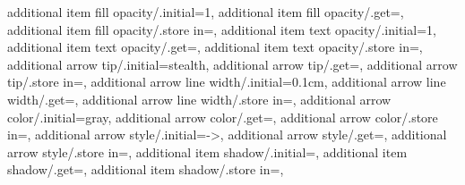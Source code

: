 {  additional item fill opacity/.initial={1},
  additional item fill opacity/.get=\sm@additions@additionalitemfillopacity,
  additional item fill opacity/.store in=\sm@additions@additionalitemfillopacity,
  additional item text opacity/.initial={1},
  additional item text opacity/.get=\sm@additions@additionalitemtextopacity,
  additional item text opacity/.store in=\sm@additions@additionalitemtextopacity,
  additional arrow tip/.initial={stealth},
  additional arrow tip/.get=\sm@additions@additionalarrowtip,
  additional arrow tip/.store in=\sm@additions@additionalarrowtip,
  additional arrow line width/.initial={0.1cm},
  additional arrow line width/.get=\sm@additions@additionalarrowlinewidth,
  additional arrow line width/.store in=\sm@additions@additionalarrowlinewidth,
  additional arrow color/.initial={gray},
  additional arrow color/.get=\sm@additions@additionalarrowcolor,
  additional arrow color/.store in=\sm@additions@additionalarrowcolor,
  additional arrow style/.initial={->},
  additional arrow style/.get=\sm@additions@additionalarrowstyle,
  additional arrow style/.store in=\sm@additions@additionalarrowstyle,
  additional item shadow/.initial={},
  additional item shadow/.get=\sm@additions@additionalitemshadow,
  additional item shadow/.store in=\sm@additions@additionalitemshadow,
}

\newif\ifconnectionsdisabled
{}


